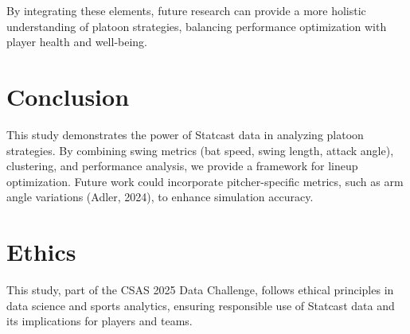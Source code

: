 \documentclass[
]{article}
\begin{document}
By integrating these elements, future research can provide a more
holistic understanding of platoon strategies, balancing performance
optimization with player health and well-being.

\hypertarget{conclusion}{%
\section{Conclusion}\label{conclusion}}

This study demonstrates the power of Statcast data in analyzing platoon
strategies. By combining swing metrics (bat speed, swing length, attack
angle), clustering, and performance analysis, we provide a framework for
lineup optimization. Future work could incorporate pitcher-specific
metrics, such as arm angle variations (Adler, 2024), to enhance
simulation accuracy.

\hypertarget{ethics}{%
\section{Ethics}\label{ethics}}

This study, part of the CSAS 2025 Data Challenge, follows ethical
principles in data science and sports analytics, ensuring responsible
use of Statcast data and its implications for players and teams.
\end{document}
